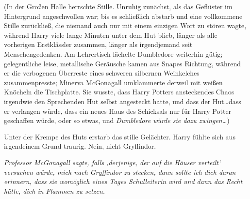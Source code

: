 (In der Großen Halle herrschte Stille. Unruhig zunächst, als das Geflüster im Hintergrund angeschwollen war; bis es schließlich abstarb und eine vollkommene Stille zurückließ, die niemand auch nur mit einem einzigen Wort zu stören wagte, während Harry viele lange Minuten unter dem Hut blieb, länger als alle vorherigen Erstklässler zusammen, länger als irgendjemand seit Menschengedenken. Am Lehrertisch lächelte Dumbledore weiterhin gütig; gelegentliche leise, metallische Geräusche kamen aus Snapes Richtung, während er die verbogenen Überreste eines schweren silbernen Weinkelches zusammenpresste; Minerva McGonagall umklammerte derweil mit weißen Knöcheln die Tischplatte. Sie wusste, dass Harry Potters ansteckendes Chaos irgendwie den Sprechenden Hut selbst angesteckt hatte, und dass der Hut…dass er verlangen würde, dass ein neues Haus des Schicksals nur für Harry Potter geschaffen würde, oder so etwas, und \emph{Dumbledore würde sie dazu zwingen…})

Unter der Krempe des Huts erstarb das stille Gelächter. Harry fühlte sich aus irgendeinem Grund traurig. Nein, nicht Gryffindor.

\emph{Professor McGonagall sagte, falls ‚derjenige, der auf die Häuser verteilt‘ versuchen würde, mich nach Gryffindor zu stecken, dann sollte ich dich daran erinnern, dass sie womöglich eines Tages Schulleiterin wird und dann das Recht hätte, dich in Flammen zu setzen. }

